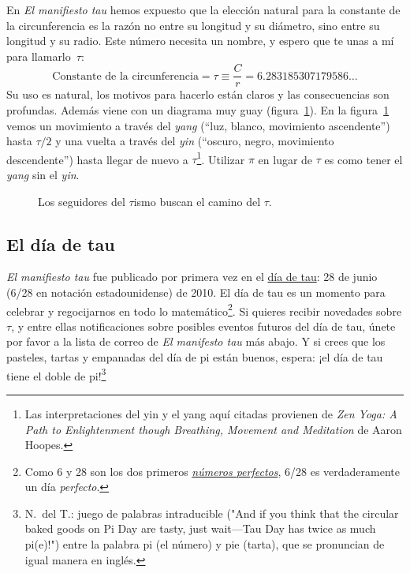 En \emph{El manifiesto tau} hemos expuesto que la elección natural para la constante de la circunferencia es la razón no entre su longitud y su diámetro, sino entre su longitud y su radio. Este número necesita un nombre, y espero que te unas a mí para llamarlo~$\tau$:
\[
  \mbox{Constante de la circunferencia} = \tau \equiv \frac{C}{r} = 6.283185307179586\ldots
\]
Su uso es natural, los motivos para hacerlo están claros y las consecuencias son profundas. Además viene con un diagrama muy guay (figura~\ref{fig:tauism}). En la figura~\ref{fig:tauism} vemos un movimiento a través del \emph{yang} (``luz, blanco, movimiento ascendente'') hasta $\tau/2$ y una vuelta a través del \emph{yin} (``oscuro, negro, movimiento descendente'') hasta llegar de nuevo a $\tau$\footnote{Las interpretaciones del yin y el yang aquí citadas provienen de \emph{Zen Yoga: A Path to Enlightenment though Breathing, Movement and Meditation} de Aaron Hoopes.}. Utilizar $\pi$ en lugar de $\tau$ es como tener el \emph{yang} sin el \emph{yin}.

\begin{figure}
\begin{center}
\end{center}
\caption{Los seguidores del $\tau$ismo buscan el camino del $\tau$.\label{fig:tauism}}
\end{figure}



  \subsection{El día de tau} %
  \label{sec:tau_day}

\emph{El manifiesto tau} fue publicado por primera vez en el \href{http://tauday.com/}{día de tau}: 28 de junio (6/28 en notación estadounidense) de 2010. El día de tau es un momento para celebrar y regocijarnos en todo lo matemático\footnote{Como 6 y 28 son los dos primeros \href{https://es.wikipedia.org/wiki/Número_perfecto}{\emph{números perfectos}}, 6/28 es verdaderamente un día \emph{perfecto}.}. Si quieres recibir novedades sobre $\tau$, y entre ellas notificaciones sobre posibles eventos futuros del día de tau, únete por favor a la lista de correo de \emph{El manifesto tau} más abajo. Y si crees que los pasteles, tartas y empanadas del día de pi están buenos, espera: ¡el día de tau tiene el doble de pi!\footnote{N.~del T.: juego de palabras intraducible ("And if you think that the circular baked goods on Pi Day are tasty, just wait—Tau Day has twice as much pi(e)!") entre la palabra pi (el número) y pie (tarta), que se pronuncian de igual manera en inglés.}


